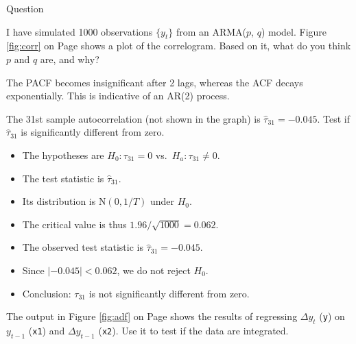\documentclass[12pt, a4paper]{article}
\begin{document}
\begin{exam}{Question \thequestion}
\begin{instructions}

\end{instructions}
\begin{problem}[6]
I have simulated 1000 observations $\{y_t\}$ from an ARMA($p$, $q$) model. Figure \ref{fig:corr} on Page \pageref{fig:corr} shows a plot of the correlogram. Based on it, what do you think $p$ and $q$ are, and why?
\begin{solution}[10cm]
The PACF becomes insignificant after 2 lags, whereas the ACF decays exponentially. This is indicative of an AR(2) process.
\end{solution}
\end{problem}
\begin{problem}[6]
The 31st sample autocorrelation (not shown in the graph) is $\hat{\tau}_{31} =-0.045$. Test if $\hat{\tau}_{31}$ is significantly different from zero.
\begin{solution}[10cm]

\begin{itemize}
\item The hypotheses are $H_0: \tau_{31} = 0$ vs.\ $H_a: \tau_{31}\neq 0$.
\item The test statistic is $\hat{\tau}_{31}$.
\item Its distribution is $\mathrm{N}(0, 1/T)$ under $H_0$.
\item The critical value is thus $1.96/\sqrt{1000} = 0.062$.
\item The observed test statistic is $\hat{\tau}_{31} =-0.045$.
\item Since $|-0.045| < 0.062$, we do not reject $H_0$.
\item Conclusion: $\tau_{31}$ is not significantly different from zero.
\end{itemize}
\end{solution}
\end{problem}

\begin{problem}[6]
The output in Figure \ref{fig:adf} on Page \pageref{fig:adf} shows the results of regressing $\Delta y_t$ (\texttt{y}) on $y_{t-1}$ (\texttt{x1}) and $\Delta y_{t-1}$ (\texttt{x2}). Use it to test if the data are integrated.
\begin{solution}[10cm]


\end{solution}
\end{problem}
\end{exam}
\end{document}
